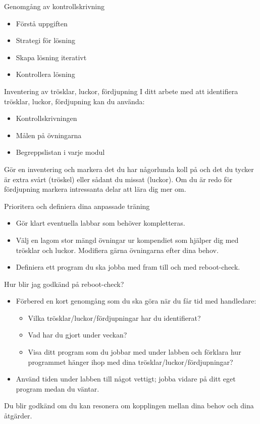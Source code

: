 \begin{Slide}{Genomgång av kontrollskrivning}
\begin{itemize}
\item Förstå uppgiften

\item Strategi för lösning

\item Skapa lösning iterativt

\item Kontrollera lösning
\end{itemize}
\end{Slide}

\begin{Slide}{Inventering av trösklar, luckor, fördjupning}
I ditt arbete med att identifiera trösklar, luckor, fördjupning kan du använda:
\begin{itemize}
\item Kontrollskrivningen
\item Målen på övningarna
\item Begreppslistan i varje modul
\end{itemize}
Gör en inventering och markera det du har någorlunda koll på och det du tycker är extra svårt (tröskel) eller sådant du missat (luckor). Om du är redo för fördjupning markera intressanta delar att lära dig mer om.
\end{Slide}

\begin{Slide}{Prioritera och definiera dina anpassade träning}
\begin{itemize}
\item Gör klart eventuella labbar som behöver kompletteras.
\item Välj en lagom stor mängd övningar ur kompendiet som hjälper dig med trösklar och luckor. Modifiera gärna övningarna efter dina behov.
\item Definiera ett program du ska jobba med fram till och med reboot-check. 
\end{itemize}
\end{Slide}

\begin{Slide}{Hur blir jag godkänd på reboot-check?}
\begin{itemize}
\item Förbered en kort genomgång som du ska göra när du får tid med handledare:
\begin{itemize}
\item Vilka trösklar/luckor/fördjupningar har du identifierat?
\item Vad har du gjort under veckan?
\item Visa ditt program som du jobbar med under labben och förklara hur programmet hänger ihop med dina trösklar/luckor/fördjupningar?
\end{itemize}
\item Använd tiden under labben till något vettigt;  jobba vidare på ditt eget program medan du väntar.
\end{itemize}
Du blir godkänd om du kan resonera om kopplingen mellan dina behov och dina åtgärder.
\end{Slide}

\fi













